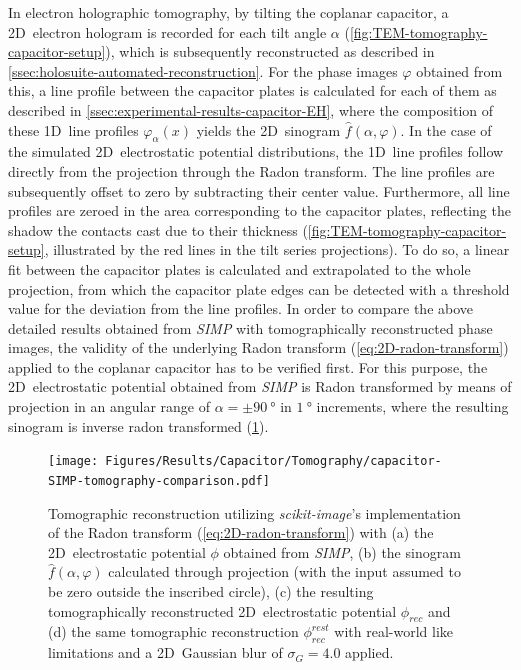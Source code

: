 In electron holographic tomography, by tilting the coplanar capacitor, a 2D~electron hologram is recorded for each tilt angle $\alpha$ (\cref{fig:TEM-tomography-capacitor-setup}), which is subsequently reconstructed as described in \cref{ssec:holosuite-automated-reconstruction}. For the phase images $\varphi$ obtained from this, a line profile between the capacitor plates is calculated for each of them as described in \cref{ssec:experimental-results-capacitor-EH}, where the composition of these 1D~line profiles $\varphi_{\alpha}\left(x\right)$ yields the 2D~sinogram $\hat{f}\left(\alpha, \varphi\right)$. In the case of the simulated 2D~electrostatic potential distributions, the 1D~line profiles follow directly from the projection through the Radon transform. The line profiles are subsequently offset to zero by subtracting their center value. Furthermore, all line profiles are zeroed in the area corresponding to the capacitor plates, reflecting the shadow the contacts cast due to their thickness (\cref{fig:TEM-tomography-capacitor-setup}, illustrated by the red lines in the tilt series projections). To do so, a linear fit between the capacitor plates is calculated and extrapolated to the whole projection, from which the capacitor plate edges can be detected with a threshold value for the deviation from the line profiles.
\newpage
In order to compare the above detailed results obtained from \emph{SIMP} with tomographically reconstructed phase images, the validity of the underlying Radon transform (\cref{eq:2D-radon-transform}) applied to the coplanar capacitor has to be verified first. For this purpose, the 2D~electrostatic potential obtained from \emph{SIMP} is Radon transformed by means of projection in an angular range of $\alpha = \pm \SI{90}{\degree}$ in $\SI{1}{\degree}$ increments, where the resulting sinogram is inverse radon transformed (\cref{fig:capacitor-SIMP-tomography-comparison}).
\begin{figure}[H]
	\centering
	\texttt{[image: Figures/Results/Capacitor/Tomography/capacitor-SIMP-tomography-comparison.pdf]}
	\caption{Tomographic reconstruction utilizing \emph{scikit-image}'s implementation \cite{Vanderwalt2014} of the Radon transform (\cref{eq:2D-radon-transform}) with (a) the 2D~electrostatic potential $\phi$ obtained from \emph{SIMP}, (b) the sinogram $\hat{f}\left(\alpha, \varphi\right)$ calculated through projection (with the input assumed to be zero outside the inscribed circle), (c) the resulting tomographically reconstructed 2D~electrostatic potential $\phi_{\mathit{rec}}$ and (d) the same tomographic reconstruction $\phi_{\mathit{rec}}^{\mathit{rest}}$ with real-world like limitations and a 2D~Gaussian blur of $\sigma_G = 4.0$ applied.}
	\label{fig:capacitor-SIMP-tomography-comparison}
\end{figure}
